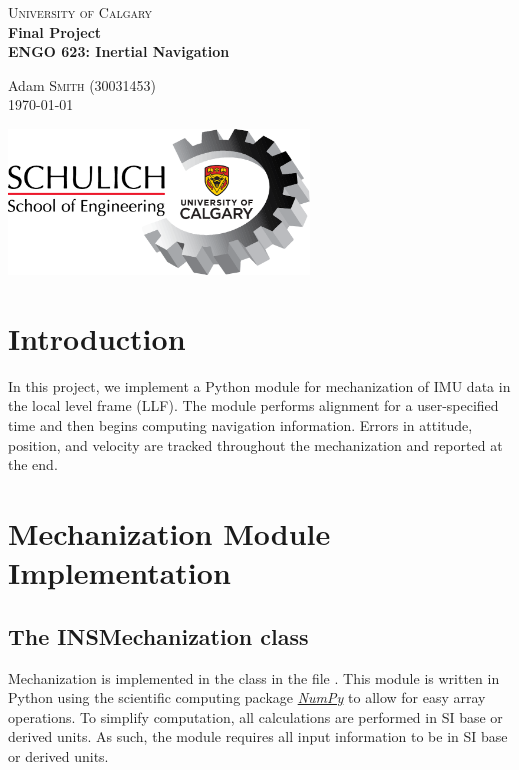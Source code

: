 \documentclass[11pt, oneside]{article}   	%
\begin{document}
\begin{titlepage}

	\center
	\textsc{\LARGE University of Calgary}\\[1.5cm]
	\vfill
	{\huge\bfseries Final Project}\\[0.4cm]
	{\huge\bfseries ENGO 623: Inertial Navigation}
	
	\vfill\vfill\vfill\vfill
	
	Adam \textsc{Smith} (30031453)\\
	
	\vfill\vfill\vfill
	{\large \today}
	
	\vfill\vfill\vfill
	\includegraphics[width=8cm,]{img/schulich.png}\\[1cm]	
\end{titlepage}

\section{Introduction}
In this project, we implement a Python module for mechanization of IMU data in the local level frame (LLF).  The module performs alignment for a user-specified time and then begins computing navigation information. Errors in attitude, position, and velocity are tracked throughout the mechanization and reported at the end.

\section{Mechanization Module Implementation}

\subsection{The INSMechanization class}
Mechanization is implemented in the  class in the file .  This module is written in Python using the scientific computing package \href{https://numpy.org}{\textit{NumPy}} to allow for easy array operations.  To simplify computation, all calculations are performed in SI base or derived units. As such, the module requires all input information to be in SI base or derived units.  
\end{document}
